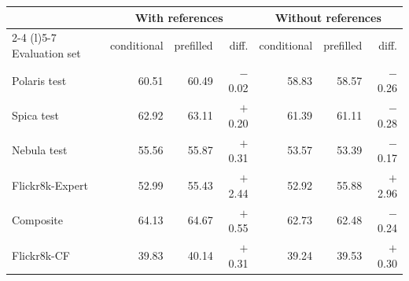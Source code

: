 \begin{tabular}{lrrrrrr}
\toprule
& \multicolumn{3}{c}{With references} & \multicolumn{3}{c}{Without references} \\
\cmidrule(lr){2-4} \cmidrule(l){5-7}
Evaluation set & conditional & prefilled & diff. & conditional & prefilled & diff. \\
\midrule
Polaris test & 60.51 & 60.49 & $-$0.02 & 58.83 & 58.57 & $-$0.26 \\
Spica test & 62.92 & 63.11 & $+$0.20 & 61.39 & 61.11 & $-$0.28 \\
Nebula test & 55.56 & 55.87 & $+$0.31 & 53.57 & 53.39 & $-$0.17 \\
Flickr8k-Expert & 52.99 & 55.43 & $+$2.44 & 52.92 & 55.88 & $+$2.96 \\
Composite & 64.13 & 64.67 & $+$0.55 & 62.73 & 62.48 & $-$0.24 \\
Flickr8k-CF & 39.83 & 40.14 & $+$0.31 & 39.24 & 39.53 & $+$0.30 \\
\bottomrule
\end{tabular}
